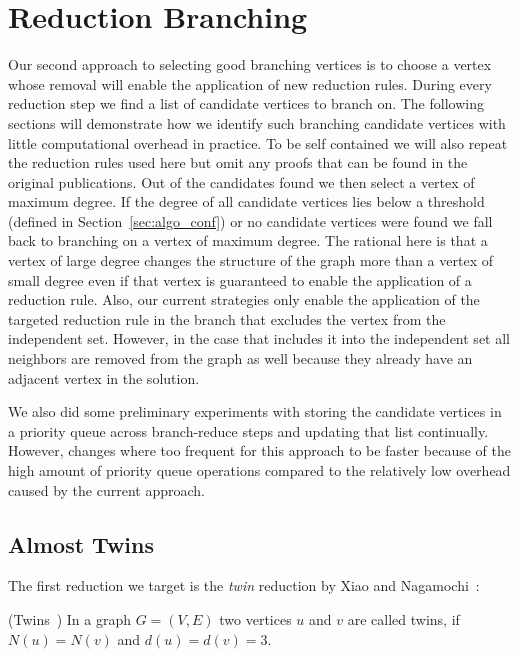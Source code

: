 \documentclass[a4paper,UKenglish,cleveref, autoref, thm-restate]{lipics-v2021}
\begin{document}
\section{Reduction Branching}
\label{sec:reduction_branching}
Our second approach to selecting good branching vertices is to choose a vertex
whose removal will enable the application of new reduction rules. During every
reduction step we find a list of candidate vertices to branch on. The following
sections will demonstrate how we identify such branching candidate vertices with little
computational overhead in practice. To be self contained we will also repeat the reduction
rules used here but omit any proofs that can be found in the original
publications. Out of the candidates found we then select a vertex of
maximum degree. If the degree of all candidate vertices lies below a threshold
(defined in Section~\ref{sec:algo_conf}) or no candidate vertices were found we fall back to branching on a vertex
of maximum degree. The rational here is that a vertex of large degree changes
the structure of the graph more than a vertex of small degree even if that
vertex is guaranteed to enable the application of a reduction rule. Also, our
current strategies only enable the application of the targeted reduction rule in
the branch that excludes the vertex from the independent set. However, in the
case that includes it into the independent set all neighbors are removed from
the graph as well because they already have an adjacent vertex in the solution.

We also did some preliminary experiments with storing the candidate vertices in
a priority queue across branch-reduce steps and updating that list continually.
However, changes where too frequent for this approach to be faster because of
the high amount of priority queue operations compared to the relatively low overhead
caused by the current approach.

\subsection{Almost Twins}

The first reduction we target is the \emph{twin} reduction by Xiao and Nagamochi~\cite{XiaoUnconfined}:

\begin{definition}(Twins~\cite{XiaoUnconfined})
  In a graph $G=(V,E)$ two vertices $u$ and $v$ are called twins, if $N(u) = N(v)$ and $d(u) = d(v) = 3$.
\end{definition}
\end{document}
